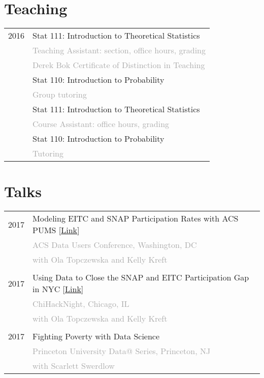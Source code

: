 \documentclass[12pt]{article}
\begin{document}
\section*{Teaching}
\label{sec:teaching}
\begin{tabular}{p{\datecolumn} l}
2016 & Stat 111: Introduction to Theoretical Statistics \\
     & \textcolor{darkgrey}{Teaching Assistant: section, office hours, grading} \\
     & \textcolor{darkgrey}{Derek Bok Certificate of Distinction in Teaching} \\
\shortrow
2015 & Stat 110: Introduction to Probability \\
     & \textcolor{darkgrey}{Group tutoring} \\
\shortrow
2015 & Stat 111: Introduction to Theoretical Statistics \\
     & \textcolor{darkgrey}{Course Assistant: office hours, grading} \\
\shortrow
2014 & Stat 110: Introduction to Probability \\
     & \textcolor{darkgrey}{Tutoring}
\end{tabular}

\section*{Talks}
\label{sec:talks}
\begin{tabular}{p{\datecolumn} l}
2017 & Modeling EITC and SNAP Participation Rates with ACS PUMS
[\href{http://www.ebmcdn.net/prb/iframe-video-viewer.php?viewnode=acs-may17/acs-051117-south-6}{Link}] \\
& \textcolor{darkgrey}{ACS Data Users Conference, Washington, DC} \\
& \textcolor{darkgrey}{with Ola Topczewska and Kelly Kreft} \\
& \\[-1.5ex]
2017 & Using Data to Close the SNAP and EITC Participation Gap in NYC
[\href{https://www.youtube.com/watch?v=XSQOCXwNqUA6}{Link}] \\
& \textcolor{darkgrey}{ChiHackNight, Chicago, IL} \\
& \textcolor{darkgrey}{with Ola Topczewska and Kelly Kreft} \\
& \\[-1.5ex]
2017 & Fighting Poverty with Data Science \\
& \textcolor{darkgrey}{Princeton University Data@ Series, Princeton, NJ} \\
& \textcolor{darkgrey}{with Scarlett Swerdlow} \\
\end{tabular}
\end{document}
